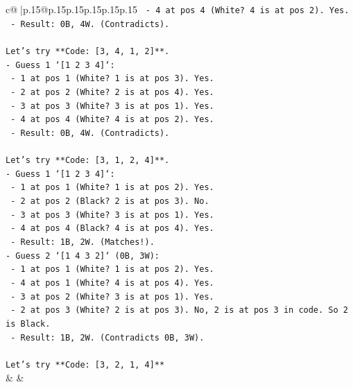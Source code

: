 \documentclass{article}
\begin{document}
{\begin{supertabular}{c@{$\;$}|p{.15\linewidth}@{}p{.15\linewidth}p{.15\linewidth}p{.15\linewidth}p{.15\linewidth}p{.15\linewidth}}
{{{\texttt{  {-} 4 at pos 4 (White? 4 is at pos 2). Yes.} \\
\texttt{  {-} Result: 0B, 4W. (Contradicts).} \\
\\ 
\texttt{Let's try **Code: {[}3, 4, 1, 2{]}**.} \\
\texttt{{-} Guess 1 `{[}1 2 3 4{]}`:} \\
\texttt{  {-} 1 at pos 1 (White? 1 is at pos 3). Yes.} \\
\texttt{  {-} 2 at pos 2 (White? 2 is at pos 4). Yes.} \\
\texttt{  {-} 3 at pos 3 (White? 3 is at pos 1). Yes.} \\
\texttt{  {-} 4 at pos 4 (White? 4 is at pos 2). Yes.} \\
\texttt{  {-} Result: 0B, 4W. (Contradicts).} \\
\\ 
\texttt{Let's try **Code: {[}3, 1, 2, 4{]}**.} \\
\texttt{{-} Guess 1 `{[}1 2 3 4{]}`:} \\
\texttt{  {-} 1 at pos 1 (White? 1 is at pos 2). Yes.} \\
\texttt{  {-} 2 at pos 2 (Black? 2 is at pos 3). No.} \\
\texttt{  {-} 3 at pos 3 (White? 3 is at pos 1). Yes.} \\
\texttt{  {-} 4 at pos 4 (Black? 4 is at pos 4). Yes.} \\
\texttt{  {-} Result: 1B, 2W. (Matches!).} \\
\texttt{{-} Guess 2 `{[}1 4 3 2{]}` (0B, 3W):} \\
\texttt{  {-} 1 at pos 1 (White? 1 is at pos 2). Yes.} \\
\texttt{  {-} 4 at pos 1 (White? 4 is at pos 4). Yes.} \\
\texttt{  {-} 3 at pos 2 (White? 3 is at pos 1). Yes.} \\
\texttt{  {-} 2 at pos 3 (White? 2 is at pos 3). No, 2 is at pos 3 in code. So 2 is Black.} \\
\texttt{  {-} Result: 1B, 2W. (Contradicts 0B, 3W).} \\
\\ 
\texttt{Let's try **Code: {[}3, 2, 1, 4{]}**} \\
            }
        }
    }
    & & \\ \\


\end{supertabular}}
\end{document}

